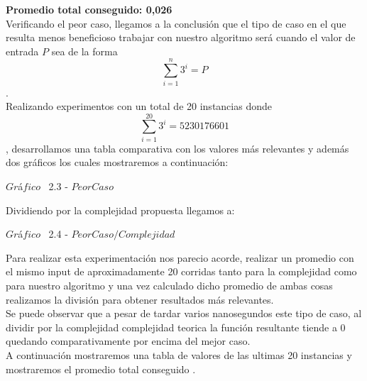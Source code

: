     \textbf{Promedio total conseguido: 0,026}  \\

Verificando el peor caso, llegamos a la conclusi\'on que el tipo de caso en el que resulta menos beneficioso trabajar con nuestro algoritmo ser\'a cuando el valor de entrada $P$ sea de la forma \[
\sum_{i=1}^{n}3^{i}=P 
\].
\\

Realizando experimentos con un total de 20 instancias donde \[
\sum_{i=1}^{20}3^{i}=5230176601 
\], desarrollamos una tabla comparativa con los valores m\'as relevantes y adem\'as dos gr\'aficos los cuales mostraremos a continuaci\'on: \\

\vspace*{0.3cm} \vspace*{0.3cm}
  \begin{center}
 {$Gr$\'a$fico$ \ 2.3 - $Peor Caso$}
  \end{center}
  \vspace*{0.3cm}


Dividiendo por la complejidad propuesta llegamos a:\\

\vspace*{0.3cm} \vspace*{0.3cm}
  \begin{center}
 {$Gr$\'a$fico$ \ 2.4 - $Peor Caso / Complejidad$}
  \end{center}
  \vspace*{0.3cm}

Para realizar esta experimentaci\'on nos parecio acorde, realizar un promedio con el mismo input de aproximadamente 20 corridas
tanto para la complejidad como para nuestro algoritmo y una vez calculado dicho promedio de ambas cosas realizamos la divisi\'on para
obtener resultados m\'as relevantes.\\ 

Se puede observar que a pesar de tardar varios nanosegundos este tipo de caso, al dividir por la complejidad complejidad teorica
la función resultante tiende a 0 quedando comparativamente por encima del mejor caso.\\

A continuaci\'on mostraremos una tabla de valores de las ultimas 20 instancias y
mostraremos el promedio total conseguido .\\


